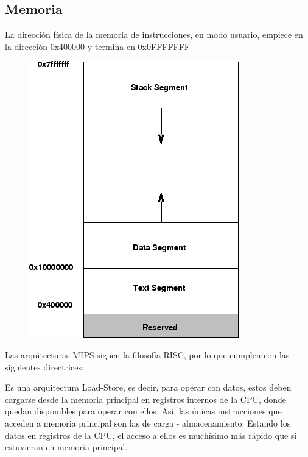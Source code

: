 \documentclass[12pt]{article}
\begin{document}
\begin{itemize}
\subsection{Memoria}
La dirección física de la memoria de instrucciones, en modo usuario, empiece en la dirección
0x400000 y termina en 0x0FFFFFFF
\begin{figure}[H]
\includegraphics[width=\textwidth]{gmemory.png}
\end{figure}
\end{itemize}
\iffalse
Las arquitecturas MIPS siguen la filosofía RISC, por lo que cumplen con las siguientes directrices:
\item Es una arquitectura Load-Store, es decir, para operar con datos, estos deben cargarse desde
la memoria principal en registros internos de la CPU, donde quedan disponibles para operar con
ellos. Así, las únicas instrucciones que acceden a memoria principal son las de carga - almacenamiento.
Estando los datos en registros de la CPU, el acceso a ellos es muchísimo más rápido que si estuvieran en memoria principal.
\end{document}
